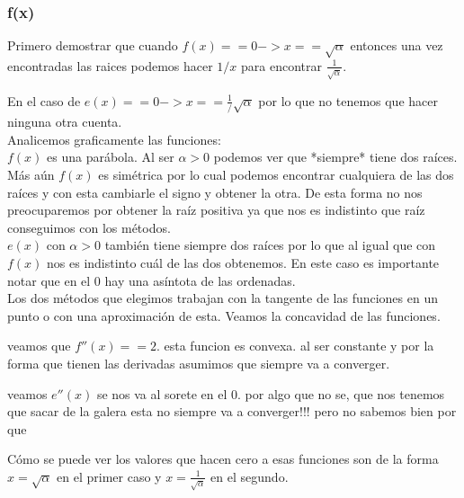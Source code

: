\subsubsection{f(x)}

Primero demostrar que cuando $f(x) == 0 -> x == \sqrt{\alpha}$
entonces una vez encontradas las raices podemos hacer $1/x$ para encontrar
$\displaystyle\frac{1}{\sqrt{\alpha}}$.

En el caso de $\displaystyle e(x) == 0 -> x == \frac{1}/{\sqrt{\alpha}}$ por lo que no tenemos que hacer
ninguna otra cuenta.\\

Analicemos graficamente las funciones:\\


$f(x)$ es una parábola. Al ser $\alpha > 0$ podemos ver que *siempre* tiene dos
raíces. Más aún $f(x)$ es simétrica por lo cual podemos encontrar cualquiera de
las dos raíces y con esta cambiarle el signo y obtener la otra. De esta forma
no nos preocuparemos por obtener la raíz positiva ya que nos es indistinto que
raíz conseguimos con los métodos.\\


$e(x)$ con $\alpha > 0$ también tiene siempre dos raíces por lo que al igual que con
$f(x)$ nos es indistinto cuál de las dos obtenemos. En este caso es importante
notar que en el 0 hay una asíntota de las ordenadas.\\
 
Los dos métodos que elegimos trabajan con la tangente de las funciones en un
punto o con una aproximación de esta. Veamos la concavidad de las funciones.




veamos que $f''(x) == 2$. esta funcion es convexa. al ser constante y por la
forma que tienen las derivadas asumimos que siempre va a converger.

veamos $e''(x)$ se nos va al sorete en el 0. por algo que no se, que nos tenemos
que sacar de la galera esta no siempre va a converger!!! pero no sabemos bien
por que


Cómo se puede ver los valores que hacen cero a esas funciones son de la forma
$x = \sqrt{\alpha}$ en el primer caso y $x = \frac{1}{\sqrt{\alpha}}$ en el
segundo.

